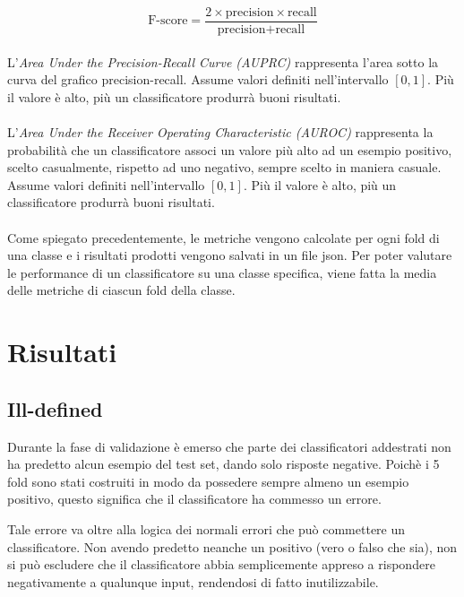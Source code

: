\documentclass[12pt,a4paper,oneside,hidelinks]{report}
\begin{document}
\begin{equation}
\text{F-score} = \frac{2 \times \text{precision} \times \text{recall}}{\text{precision} + \text{recall}}
\end{equation}

\paragraph*{}
L'\textit{Area Under the Precision-Recall Curve (AUPRC)} rappresenta l'area sotto la curva del grafico precision-recall. Assume valori definiti nell'intervallo $[0,1]$. Più il valore è alto, più un classificatore produrrà buoni risultati.

\paragraph*{}
L'\textit{Area Under the Receiver Operating Characteristic (AUROC)} rappresenta la probabilità che un classificatore associ un valore più alto ad un esempio positivo, scelto casualmente, rispetto ad uno negativo, sempre scelto in maniera casuale. Assume valori definiti nell'intervallo $[0,1]$. Più il valore è alto, più un classificatore produrrà buoni risultati.

\paragraph*{}
Come spiegato precedentemente, le metriche vengono calcolate per ogni fold di una classe e i risultati prodotti vengono salvati in un file json. Per poter valutare le performance di un classificatore su una classe specifica, viene fatta la media delle metriche di ciascun fold della classe.

\section{Risultati}

\subsection{Ill-defined}
Durante la fase di validazione è emerso che parte dei classificatori addestrati non ha predetto alcun esempio del test set, dando solo risposte negative. Poichè i 5 fold sono stati costruiti in modo da possedere sempre almeno un esempio positivo, questo significa che il classificatore ha commesso un errore.

Tale errore va oltre alla logica dei normali errori che può commettere un classificatore. Non avendo predetto neanche un positivo (vero o falso che sia), non si può escludere che il classificatore abbia semplicemente appreso a rispondere negativamente a qualunque input, rendendosi di fatto inutilizzabile.
\end{document}
